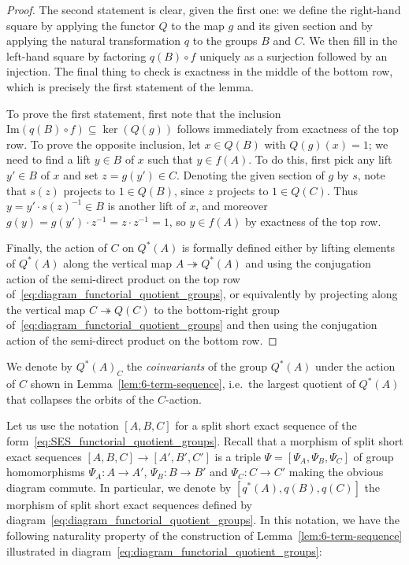 \documentclass[AHL,Unicode,published]{cedram}
\newcommand{\im}{\mathrm{Im}}
\begin{document}
\begin{proof}
The second statement is clear, given the first one: we define the right-hand square by applying the functor $Q$ to the map $g$ and its given section and by applying the natural transformation $q$ to the groups $B$ and $C$. We then fill in the left-hand square by factoring $q(B) \circ f$ uniquely as a surjection followed by an injection. The final thing to check is exactness in the middle of the bottom row, which is precisely the first statement of the lemma.

To prove the first statement, first note that the inclusion $\im(q(B) \circ f) \subseteq \ker(Q(g))$ follows immediately from exactness of the top row. To prove the opposite inclusion, let $x \in Q(B)$ with $Q(g)(x) = 1$; we need to find a lift $y \in B$ of $x$ such that $y \in f(A)$. To do this, first pick any lift $y' \in B$ of $x$ and set $z = g(y') \in C$. Denoting the given section of $g$ by $s$, note that $s(z)$ projects to $1 \in Q(B)$, since $z$ projects to $1 \in Q(C)$. Thus $y = y' \cdot s(z)^{-1} \in B$ is another lift of $x$, and moreover $g(y) = g(y') \cdot z^{-1} = z \cdot z^{-1} = 1$, so $y \in f(A)$ by exactness of the top row.

Finally, the action of $C$ on $Q^{*}(A)$ is formally defined either by lifting elements of $Q^{*}(A)$ along the vertical map $A\twoheadrightarrow Q^{*}(A)$ and using the conjugation action of the semi-direct product on the top row of~\eqref{eq:diagram_functorial_quotient_groups}, or equivalently by projecting along the vertical map $C\twoheadrightarrow Q(C)$ to the bottom-right group of~\eqref{eq:diagram_functorial_quotient_groups} and then using the conjugation action of the semi-direct product on the bottom row.
\end{proof}

\begin{notation}
We denote by $Q^{*}(A)_{C}$ the \emph{coinvariants} of the group $Q^{*}(A)$ under the action of $C$ shown in Lemma~\ref{lem:6-term-sequence}, i.e.~the largest quotient of $Q^{*}(A)$ that collapses the orbits of the $C$-action.
\end{notation}

Let us use the notation $[A,B,C]$ for a split short exact sequence of the form~\eqref{eq:SES_functorial_quotient_groups}. Recall that a morphism of split short exact sequences $[A,B,C]\to [A',B',C']$ is a triple $\Psi=[\Psi_{A},\Psi_{B},\Psi_{C}]$ of group homomorphisms $\Psi_{A}\colon A\to A'$, $\Psi_{B}\colon B\to B'$ and $\Psi_{C}\colon C\to C'$ making the obvious diagram commute. In particular, we denote by $[q^{*}(A),q(B),q(C)]$ the morphism of split short exact sequences defined by diagram~\eqref{eq:diagram_functorial_quotient_groups}. In this notation, we have the following naturality property of the construction of Lemma~\ref{lem:6-term-sequence} illustrated in diagram~\eqref{eq:diagram_functorial_quotient_groups}:
\end{document}
